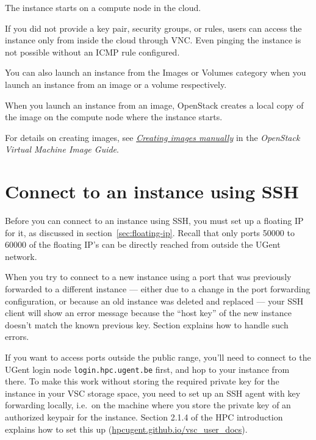 The instance starts on a compute node in the cloud.

 If you did not provide a key pair, security groups, or
rules, users can access the instance only from inside the cloud
through VNC. Even pinging the instance is not possible without an ICMP
rule configured.

You can also launch an instance from the Images or Volumes category when
you launch an instance from an image or a volume respectively.

When you launch an instance from an image, OpenStack creates a local
copy of the image on the compute node where the instance starts.

For details on creating images, see
\href{https://docs.openstack.org/image-guide/create-images-manually.html}{\emph{Creating
images manually}} in the \emph{OpenStack Virtual Machine Image Guide}.

\section{Connect to an instance using SSH}\label{connect-to-your-instance-using-ssh}
Before you can connect to an instance using SSH, you must set up a
floating IP for it, as discussed in section~\ref{sec:floating-ip}.
Recall that only ports 50000 to 60000 of the floating IP's can be
directly reached from outside the UGent network.

 When you try to connect to a new instance using a port
that was previously forwarded to a different instance --- either due
to a change in the port forwarding configuration, or because an old
instance was deleted and replaced --- your SSH client will show an
error message because the ``host key'' of the new instance doesn't
match the known previous key.  Section 
explains how to handle such errors.

 If you want to access ports outside the public range,
you'll need to connect to the UGent login node
\lstinline{login.hpc.ugent.be} first, and hop to your instance from
there.  To make this work without storing the required private key for
the instance in your VSC storage space, you need to set up an SSH
agent with key forwarding locally, i.e.\ on the machine where you
store the private key of an authorized keypair for the instance.
Section 2.1.4 of the HPC introduction explains how to set this up
(\href{https://hpcugent.github.io/vsc\_user\_docs}{hpcugent.github.io/vsc\_user\_docs}).

